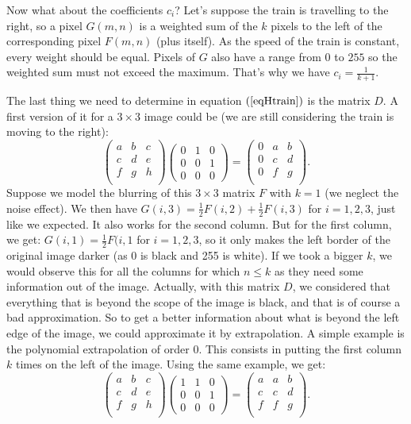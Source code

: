 Now what about the coefficients $c_i$? Let's suppose the train is travelling to the right, so a pixel $G(m,n)$ is a weighted sum of the $k$ pixels to the left of the corresponding pixel $F(m,n)$ (plus itself). As the speed of the train is constant, every weight should be equal. Pixels of $G$ also have a range from $0$ to $255$ so the weighted sum must not exceed the maximum. That's why we have $c_i=\frac{1}{k+1}$.

The last thing we need to determine in  equation $(\ref{eqHtrain})$ is the matrix $D$. A first version of it for a $3 \times 3$ image could be (we are still considering the train is moving to the right):
$$
\begin{pmatrix}
a & b & c \\
c & d & e \\
f & g & h \\
\end{pmatrix}
\begin{pmatrix}
0 & 1 & 0 \\
0 & 0 & 1 \\
0 & 0 & 0
\end{pmatrix}
=
\begin{pmatrix}
0 & a & b \\
0 & c & d \\
0 & f & g \\
\end{pmatrix}.
$$
Suppose we model the blurring of this $3 \times 3$ matrix $F$ with $k=1$ (we neglect the noise effect). We then have $G(i,3) = \frac{1}{2} F(i,2) + \frac{1}{2} F(i,3)$ for $i={1,2,3}$, just like we expected. It also works for the second column. But for the first column, we get: $G(i,1) = \frac{1}{2} F(i,1$ for $i={1,2,3}$, so it only makes the left border of the original image darker (as 0 is black and 255 is white). If we took a bigger $k$, we would observe this for all the columns for which $n \leq k$ as they need some information out of the image. Actually, with this matrix $D$, we considered that everything that is beyond the scope of the image is black, and that is of course a bad approximation. So to get a better information about what is beyond the left edge of the image, we could approximate it by extrapolation. A simple example is the polynomial extrapolation of order 0. This consists in putting the first column $k$ times on the left of the image. Using the same example, we get:
$$
\begin{pmatrix}
a & b & c \\
c & d & e \\
f & g & h \\
\end{pmatrix}
\begin{pmatrix}
1 & 1 & 0 \\
0 & 0 & 1 \\
0 & 0 & 0
\end{pmatrix}
=
\begin{pmatrix}
a & a & b \\
c & c & d \\
f & f & g \\
\end{pmatrix}.
$$
